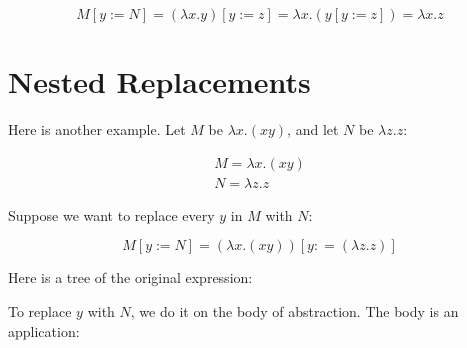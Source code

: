 \documentclass{book}
\numberwithin{equation}{chapter}
\begin{document}
\begin{equation}
M[y := N] = (\lambda x.y)[y := z] = \lambda x.(y[y := z]) = \lambda x.z
\end{equation}


\section{Nested Replacements}

Here is another example. Let $M$ be $\lambda x.(x y)$, and let $N$ be $\lambda z.z$:

\begin{align}
M = \lambda x.(x y) \\
N = \lambda z.z
\end{align}

\noindent
Suppose we want to replace every $y$ in $M$ with $N$:

\begin{equation}
M[y := N] = (\lambda x.(x y))[y: = (\lambda z.z)]
\end{equation}

\noindent
Here is a tree of the original expression:

\begin{center}
\end{center}

\noindent
To replace $y$ with $N$, we do it on the body of abstraction. The body is an application:

\begin{center}
\end{center}
\end{document}

